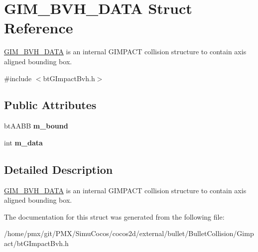 \hypertarget{structGIM__BVH__DATA}{}\section{G\+I\+M\+\_\+\+B\+V\+H\+\_\+\+D\+A\+TA Struct Reference}
\label{structGIM__BVH__DATA}


\hyperlink{structGIM__BVH__DATA}{G\+I\+M\+\_\+\+B\+V\+H\+\_\+\+D\+A\+TA} is an internal G\+I\+M\+P\+A\+CT collision structure to contain axis aligned bounding box.  




{\ttfamily \#include $<$bt\+G\+Impact\+Bvh.\+h$>$}

\subsection*{Public Attributes}
\begin{DoxyCompactItemize}
\item 
\mbox{\label{structGIM__BVH__DATA_af76e5bb8f71d46972230416e53d0334f}} 
bt\+A\+A\+BB {\bfseries m\+\_\+bound}
\item 
\mbox{\label{structGIM__BVH__DATA_ae16784b51d90513673f6ab4dd8c5ee1b}} 
int {\bfseries m\+\_\+data}
\end{DoxyCompactItemize}


\subsection{Detailed Description}
\hyperlink{structGIM__BVH__DATA}{G\+I\+M\+\_\+\+B\+V\+H\+\_\+\+D\+A\+TA} is an internal G\+I\+M\+P\+A\+CT collision structure to contain axis aligned bounding box. 

The documentation for this struct was generated from the following file\+:\begin{DoxyCompactItemize}
\item 
/home/pmx/git/\+P\+M\+X/\+Simu\+Cocos/cocos2d/external/bullet/\+Bullet\+Collision/\+Gimpact/bt\+G\+Impact\+Bvh.\+h\end{DoxyCompactItemize}
